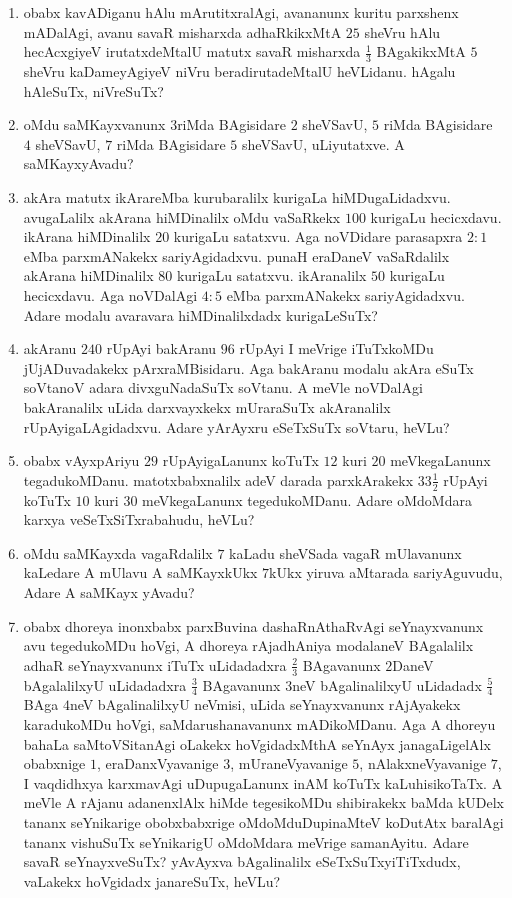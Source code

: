 \begin{enumerate}
\item obabx kavADiganu hAlu mArutitxralAgi, avananunx kuritu parxshenx
mADalAgi, avanu savaR misharxda adhaR\-kikxMtA $25$ sheVru hAlu
hecAcxgiyeV irutatxdeMtalU matutx savaR misharxda $\frac{1}{3}$
BAgakikxMtA $5$ sheVru kaDameyAgiyeV niVru beradirutadeMtalU
heVLidanu. hAgalu hAleSuTx, niVreSuTx?

\item oMdu saMKayxvanunx $3$riMda BAgisidare $2$ sheVSavU, $5$ riMda
BAgisidare $4$ sheVSavU, $7$ riMda BAgisidare $5$ sheVSavU,
uLiyutatxve. A saMKayxyAvadu?

\item akAra matutx ikArareMba kurubaralilx kurigaLa
hiMDugaLidadxvu. avugaLalilx akArana hiMDinalilx oMdu vaSaRkekx $100$
kurigaLu hecicxdavu. ikArana hiMDinalilx $20$ kurigaLu satatxvu. Aga
noVDidare parasapxra $2:1$ eMba parxmANakekx sariyAgidadxvu. punaH
eraDaneV vaSaRdalilx akArana hiMDinalilx $80$ kurigaLu
satatxvu. ikAranalilx $50$ kurigaLu hecicxdavu. Aga noVDalAgi $4:5$
eMba parxmANakekx sariyAgidadxvu. Adare modalu avaravara
hiMDinalilxdadx kurigaLeSuTx?

\item akAranu $240$ rUpAyi bakAranu $96$ rUpAyi I meVrige iTuTxkoMDu
jUjADuvadakekx pArxraMBisidaru. Aga bakAranu modalu akAra eSuTx
soVtanoV adara divxguNadaSuTx soVtanu. A meVle noVDalAgi bakAranalilx
uLida darxvayxkekx mUraraSuTx akAranalilx rUpAyigaLAgidadxvu. Adare
yArAyxru eSeTxSuTx soVtaru, heVLu?

\item obabx vAyxpAriyu $29$ rUpAyigaLanunx koTuTx $12$ kuri $20$
meVkegaLanunx tegadukoMDanu. matotxbabxnalilx adeV darada parxkArakekx
$33\frac{1}{2}$ rUpAyi koTuTx $10$ kuri $30$ meVkegaLanunx
tegedukoMDanu. Adare oMdoMdara karxya veSeTxSiTxrabahudu, heVLu?

\item oMdu saMKayxda vagaRdalilx $7$ kaLadu sheVSada vagaR mUlavanunx
kaLedare A mUlavu A saMKayxkUkx $7$kUkx yiruva aMtarada sariyAguvudu,
Adare A saMKayx yAvadu?

\item obabx dhoreya inonxbabx parxBuvina dashaRnAthaRvAgi
seYnayxvanunx avu tegedukoMDu hoVgi, A dhoreya rAjadhAniya modalaneV
BAgalalilx adhaR seYnayxvanunx iTuTx uLidadadxra $\frac{2}{3}$
BAgavanunx $2$DaneV bAgalalilxyU uLidadadxra $\frac{3}{4}$ BAgavanunx
$3$neV bAgalinalilxyU uLidadadx $\frac{5}{4}$ BAga $4$neV
bAgalinalilxyU neVmisi, uLida seYnayxvanunx rAjAyakekx karadukoMDu
hoVgi, saMdarushanavanunx mADikoMDanu. Aga A dhoreyu bahaLa
saMtoVSitanAgi oLakekx hoVgidadxMthA seYnAyx janagaLigelAlx obabxnige
$1$, eraDanxVyavanige $3$, mUraneVyavanige $5$, nAlakxneVyavanige $7$,
I vaqdidhxya karxmavAgi uDupugaLanunx inAM koTuTx kaLuhisikoTaTx. A
meVle A rAjanu adanenxlAlx hiMde tegesikoMDu shibirakekx baMda kUDelx
tananx seYnikarige obobxbabxrige oMdoMduDupinaMteV koDutAtx baralAgi
tananx vishuSuTx seYnikarigU oMdoMdara meVrige samanAyitu. Adare savaR
seYnayxveSuTx? yAvAyxva bAgalinalilx eSeTxSuTxyiTiTxdudx, vaLakekx
hoVgidadx janareSuTx, heVLu?


\end{enumerate}
